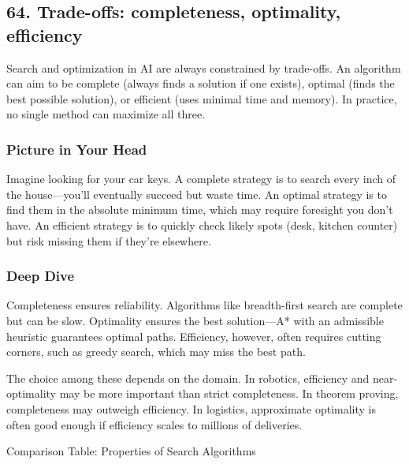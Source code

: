 \documentclass[
  letterpaper,
  DIV=11,
  numbers=noendperiod]{scrreprt}
\begin{document}
\subsection{64. Trade-offs: completeness, optimality,
efficiency}\label{trade-offs-completeness-optimality-efficiency}

Search and optimization in AI are always constrained by trade-offs. An
algorithm can aim to be complete (always finds a solution if one
exists), optimal (finds the best possible solution), or efficient (uses
minimal time and memory). In practice, no single method can maximize all
three.

\subsubsection{Picture in Your Head}\label{picture-in-your-head-63}

Imagine looking for your car keys. A complete strategy is to search
every inch of the house---you'll eventually succeed but waste time. An
optimal strategy is to find them in the absolute minimum time, which may
require foresight you don't have. An efficient strategy is to quickly
check likely spots (desk, kitchen counter) but risk missing them if
they're elsewhere.

\subsubsection{Deep Dive}\label{deep-dive-63}

Completeness ensures reliability. Algorithms like breadth-first search
are complete but can be slow. Optimality ensures the best solution---A*
with an admissible heuristic guarantees optimal paths. Efficiency,
however, often requires cutting corners, such as greedy search, which
may miss the best path.

The choice among these depends on the domain. In robotics, efficiency
and near-optimality may be more important than strict completeness. In
theorem proving, completeness may outweigh efficiency. In logistics,
approximate optimality is often good enough if efficiency scales to
millions of deliveries.

Comparison Table: Properties of Search Algorithms
\end{document}
